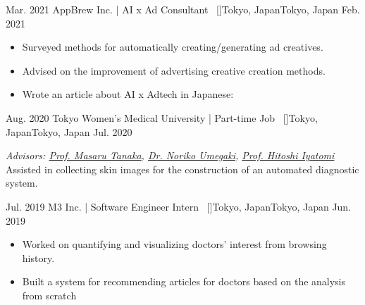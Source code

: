 \begin{experiences}
    \emptySeparator
    \researchexperience
    {Mar. 2021}   {AppBrew Inc. | AI x Ad Consultant{\normalfont  ~ [\href{https://appbrew.io/}{\small{\websiteSymbol}}]}}{Tokyo, Japan}{Tokyo, Japan}
    {Feb. 2021} {
    \begin{itemize}
        \item Surveyed methods for automatically creating/generating ad creatives.
        \item Advised on the improvement of advertising creative creation methods.
        \item Wrote an article about AI x Adtech in Japanese:
    \end{itemize}
    }

    \emptySeparator
    \researchexperience
    {Aug. 2020}   {Tokyo Women's Medical University | Part-time Job{\normalfont  ~ [\href{https://www.twmu.ac.jp/english/}{\small{\websiteSymbol}}]}}{Tokyo, Japan}{Tokyo, Japan}
    {Jul. 2020} {
    \textit{Advisors: \href{https://www.researchgate.net/scientific-contributions/Masaru-Tanaka-2078765174}{Prof. Masaru Tanaka}, \href{https://researchmap.jp/7000025183?lang=en}{Dr. Noriko Umegaki}, \href{https://scholar.google.com/citations?user=ghyQxvIAAAAJ}{Prof. Hitoshi Iyatomi}}\\
    Assisted in collecting skin images for the construction of an automated diagnostic system.

    }

    \emptySeparator
    \researchexperience
    {Jul. 2019}   {M3 Inc. | Software Engineer Intern{\normalfont  ~ [\href{https://corporate.m3.com/en/}{\small{\websiteSymbol}}]}}{Tokyo, Japan}{Tokyo, Japan}
    {Jun. 2019} {
    \begin{itemize}
        \item Worked on quantifying and visualizing doctors' interest from browsing history.
        \item Built a system for recommending articles for doctors based on the analysis from scratch
    \end{itemize}
    }



\end{experiences}
